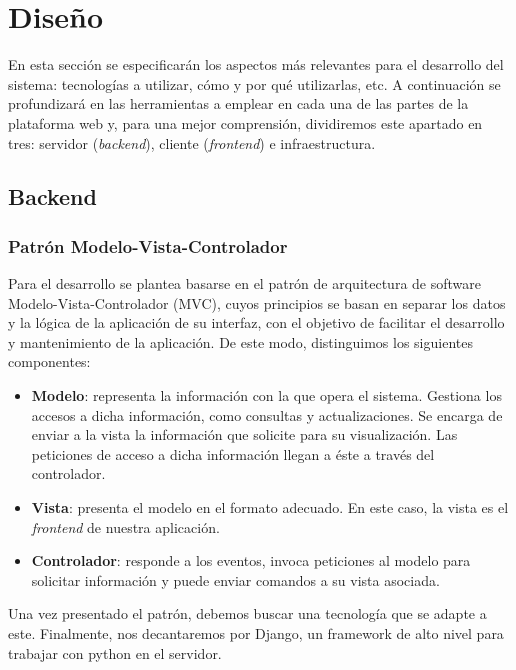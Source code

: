 \chapter{Diseño}
\label{cap:disenio}

En esta sección se especificarán los aspectos más relevantes para el desarrollo del sistema: tecnologías a utilizar, cómo y por qué utilizarlas, etc. A continuación se profundizará en las herramientas a emplear en cada una de las partes de la plataforma web y, para una mejor comprensión, dividiremos este apartado en tres: servidor (\textit{backend}), cliente (\textit{frontend}) e infraestructura.

\section{Backend}

\subsection{Patrón Modelo-Vista-Controlador}

Para el desarrollo se plantea basarse en el patrón de arquitectura de software Modelo-Vista-Controlador (MVC), cuyos principios se basan en separar los datos y la lógica de la aplicación de su interfaz, con el objetivo de facilitar el desarrollo y mantenimiento de la aplicación. De este modo, distinguimos los siguientes componentes:

\begin{itemize}
    \item \textbf{Modelo}: representa la información con la que opera el sistema. Gestiona los accesos a dicha información, como consultas y actualizaciones. Se encarga de enviar a la vista la información que solicite para su visualización. Las peticiones de acceso a dicha información llegan a éste a través del controlador.
    \item \textbf{Vista}: presenta el modelo en el formato adecuado. En este caso, la vista es el \textit{frontend} de nuestra aplicación.
    \item \textbf{Controlador}: responde a los eventos, invoca peticiones al modelo para solicitar información y puede enviar comandos a su vista asociada.
\end{itemize}

Una vez presentado el patrón, debemos buscar una tecnología que se adapte a este. Finalmente, nos decantaremos por Django, un framework de alto nivel para trabajar con python en el servidor.

